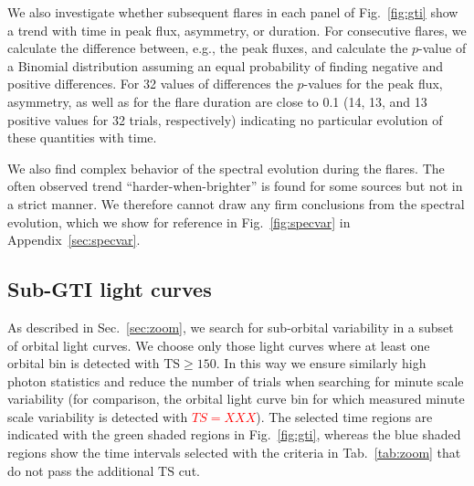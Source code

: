 \documentclass[twocolumn]{aastex62}
\newcommand{\todo}[1]{\textbf{\textcolor{red}{#1}}}
\begin{document}
We also investigate whether subsequent flares in each panel of Fig.~\ref{fig:gti} show a trend with time in peak flux, asymmetry, or duration. 
For consecutive flares, we calculate the difference between, e.g., the peak fluxes, and calculate the $p$-value of a Binomial distribution assuming an equal probability of finding negative and positive differences.
For 32 values of differences the $p$-values for the peak flux, asymmetry, as well as for the flare duration are close to 0.1 (14, 13, and 13 positive values for 32 trials, respectively) indicating no particular evolution of these quantities with time. 

We also find complex behavior of the spectral evolution during the flares. The often observed trend ``harder-when-brighter'' is found  for some sources but not in a strict manner. 
We therefore cannot draw any firm conclusions from the spectral evolution, which we show for reference in Fig.~\ref{fig:specvar} in  Appendix~\ref{sec:specvar}. 



\subsection{Sub-GTI light curves}
As described in Sec.~\ref{sec:zoom}, we search for sub-orbital variability in a subset of orbital light curves. 
We choose only those light curves where at least one orbital bin is detected with $\mathrm{TS} \geqslant 150$. 
In this way we ensure similarly high photon statistics and reduce the number of trials when searching for minute scale variability (for comparison, the orbital light curve bin for which \citet{TheFermi-LAT:2016dss} measured minute scale variability is detected with \todo{$TS = XXX$}). 
The selected time regions are indicated with the green shaded regions in Fig.~\ref{fig:gti}, whereas the blue shaded regions show the time intervals selected with the criteria in Tab.~\ref{tab:zoom} that do not pass the additional $\mathrm{TS}$ cut.
\end{document}
